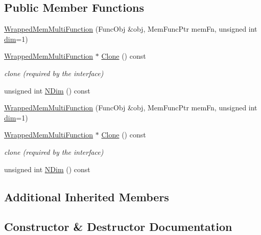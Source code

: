 \subsection*{Public Member Functions}
\begin{DoxyCompactItemize}
\item 
\mbox{\hyperlink{classROOT_1_1Math_1_1WrappedMemMultiFunction_a611b693f11a43c474d2292e7aadb0811}{Wrapped\+Mem\+Multi\+Function}} (Func\+Obj \&obj, Mem\+Func\+Ptr mem\+Fn, unsigned int \mbox{\hyperlink{irrep__util_8cc_a70b5e28b5bc3d1b63a7435c5fe50b837}{dim}}=1)
\item 
\mbox{\hyperlink{classROOT_1_1Math_1_1WrappedMemMultiFunction}{Wrapped\+Mem\+Multi\+Function}} $\ast$ \mbox{\hyperlink{classROOT_1_1Math_1_1WrappedMemMultiFunction_ab9f49fc9a151e8d921dbe9cb148c1fc8}{Clone}} () const
\begin{DoxyCompactList}\small\item\em clone (required by the interface) \end{DoxyCompactList}\item 
unsigned int \mbox{\hyperlink{classROOT_1_1Math_1_1WrappedMemMultiFunction_ae9aaf3de1f2e1e6e1c1310fccdb06009}{N\+Dim}} () const
\item 
\mbox{\hyperlink{classROOT_1_1Math_1_1WrappedMemMultiFunction_a611b693f11a43c474d2292e7aadb0811}{Wrapped\+Mem\+Multi\+Function}} (Func\+Obj \&obj, Mem\+Func\+Ptr mem\+Fn, unsigned int \mbox{\hyperlink{irrep__util_8cc_a70b5e28b5bc3d1b63a7435c5fe50b837}{dim}}=1)
\item 
\mbox{\hyperlink{classROOT_1_1Math_1_1WrappedMemMultiFunction}{Wrapped\+Mem\+Multi\+Function}} $\ast$ \mbox{\hyperlink{classROOT_1_1Math_1_1WrappedMemMultiFunction_ab9f49fc9a151e8d921dbe9cb148c1fc8}{Clone}} () const
\begin{DoxyCompactList}\small\item\em clone (required by the interface) \end{DoxyCompactList}\item 
unsigned int \mbox{\hyperlink{classROOT_1_1Math_1_1WrappedMemMultiFunction_ae9aaf3de1f2e1e6e1c1310fccdb06009}{N\+Dim}} () const
\end{DoxyCompactItemize}
\subsection*{Additional Inherited Members}


\subsection{Constructor \& Destructor Documentation}
\mbox{\label{classROOT_1_1Math_1_1WrappedMemMultiFunction_a611b693f11a43c474d2292e7aadb0811}} 
